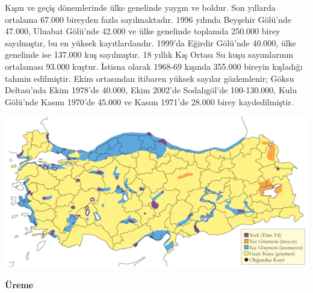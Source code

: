 \documentclass[
  a4paper,
  DIV=11,
  numbers=noendperiod]{scrreprt}
\begin{document}
Kışın ve geçiş dönemlerinde ülke genelinde yaygın ve boldur. Son
yıllarda ortalama 67.000 bireyden fazla sayılmaktadır. 1996 yılında
Beyşehir Gölü'nde 47.000, Uluabat Gölü'nde 42.000 ve ülke genelinde
toplamda 250.000 birey sayılmıştır, bu en yüksek kayıtlardandır. 1999'da
Eğirdir Gölü'nde 40.000, ülke genelinde ise 137.000 kuş sayılmıştır. 18
yıllık Kış Ortası Su kuşu sayımlarının ortalaması 93.000 kuştur. İstisna
olarak 1968-69 kışında 355.000 bireyin kışladığı tahmin edilmiştir. Ekim
ortasından itibaren yüksek sayılar gözlemlenir; Göksu Deltası'nda Ekim
1978'de 40.000, Ekim 2002'de Sodalıgöl'de 100-130.000, Kulu Gölü'nde
Kasım 1970'de 45.000 ve Kasım 1971'de 28.000 birey kaydedilmiştir.

\includegraphics{images/harita_Page_023.png}

\textbf{Üreme}
\end{document}
